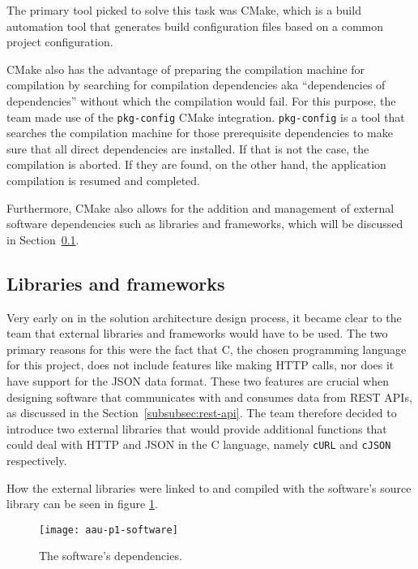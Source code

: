 The primary tool picked to solve this task was CMake, which is a build automation tool that generates build
configuration files based on a common project configuration.

CMake also has the advantage of preparing the compilation machine for compilation by searching for compilation
dependencies aka ``dependencies of dependencies'' without which the compilation would fail.
For this purpose, the team made use of the \lstinline{pkg-config} CMake integration.
\lstinline{pkg-config} is a tool that searches the compilation machine for those prerequisite dependencies to
make sure that all direct dependencies are installed.
If that is not the case, the compilation is aborted.
If they are found, on the other hand, the application compilation is resumed and completed.

Furthermore, CMake also allows for the addition and management of external software dependencies such as libraries
and frameworks, which will be discussed in Section~\ref{subsec:libraries-and-frameworks}.

\subsection{Libraries and frameworks}\label{subsec:libraries-and-frameworks}


Very early on in the solution architecture design process, it became clear to the team that external libraries and
frameworks would have to be used.
The two primary reasons for this were the fact that C, the chosen programming language for this project, does not
include features like making HTTP calls, nor does it have support for the JSON data format.
These two features are crucial when designing software that communicates with and consumes data from REST APIs, as
discussed in the Section~\ref{subsubsec:rest-api}.
The team therefore decided to introduce two external libraries that would provide additional functions that could
deal with HTTP and JSON in the C language, namely \lstinline{cURL} and \lstinline{cJSON} respectively.

How the external libraries were linked to and compiled with the software's source library can be seen in figure
\ref{fig:figure10}.


\begin{figure}
    \centering
    \caption{The software's dependencies.}
    \texttt{[image: aau-p1-software]}
    \label{fig:figure10}
\end{figure}

